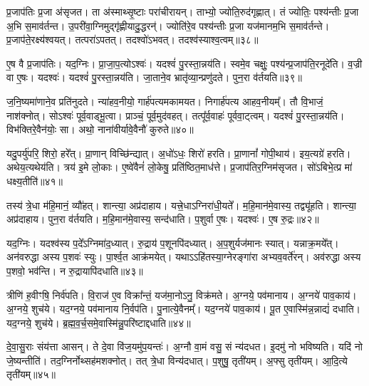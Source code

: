 प्र॒जा\-प॑तिः प्र॒जा अ॑\-सृजत।
ता अ॑स्माथ्सृ॒ष्टाः परा॑चीरायन्।
ताभ्यो॒ ज्योति॒रुद॑गृह्णात्।
तं ज्योतिः॒ पश्य॑न्तीः प्र॒जा अ॒भि स॒माव॑र्तन्त।
उ॒परी॑वा॒ग्निमुद्गृ॑ह्णीयादु॒द्धरन्॑।
ज्योति॑रे॒व पश्य॑न्तीः प्र॒जा यज॑मानम॒भि स॒माव॑र्तन्ते।
प्र॒जा\-प॑ते॒रक्ष्य॑श्वयत्।
तत्परा॑\-ऽपतत्।
तदश्वो॑\-ऽभवत्।
तदश्व॑स्याश्व॒त्वम्॥३८॥\ip

ए॒ष वै प्र॒जा\-प॑तिः।
यद॒ग्निः।
प्रा॒जा॒प॒त्यो\-ऽश्वः॑।
यदश्वं॑ पु॒रस्ता॒न्नय॑ति।
स्वमे॒व चक्षुः॒ पश्य॑न्प्र॒जा\-प॑ति॒रनूदे॑ति।
व॒ज्री वा ए॒षः।
यदश्वः॑।
यदश्वं॑ पु॒रस्ता॒न्नय॑ति।
जा॒ताने॒व भ्रातृ॑व्या॒न्प्रणु॑दते।
पुन॒रा व॑र्तयति॥३९॥\ip

ज॒नि॒ष्यमा॑णाने॒व प्रति॑\-नुदते।
न्या॑हव॒नीयो॒ गार्\mbox{}ह॑पत्य\-मकामयत।
निगार्\mbox{}ह॑पत्य आहव॒नीयम्᳚।
तौ वि॒भाजं॒ नाश॑क्नोत्।
सोऽश्वः॑ पूर्व॒वाड्भू॒त्वा।
प्राञ्चं॒ पूर्व॒मुद॑वहत्।
तत्पू᳚र्व॒वाहः॑ पूर्ववा॒ट्त्वम्।
यदश्वं॑ पु॒रस्ता॒न्नय॑ति।
विभ॑क्ति\-रे॒वैन॑योः॒ सा।
अथो॒ नाना॑वीर्यावे॒वैनौ॑ कुरुते॥४०॥\ip

यदु॒पर्यु॑परि॒ शिरो॒ हरे᳚त्।
प्रा॒णान्‌ वि\-च्छि॑न्द्यात्।
अ॒धो॑ऽधः॒ शिरो॑ हरति।
प्रा॒णानां᳚ गोपी॒थाय॑।
इय॒त्यग्रे॑ हरति।
अथेय॒त्यथेय॑ति।
त्रय॑ इ॒मे लो॒काः।
ए॒ष्वे॑वैनं॑ लो॒केषु॒ प्रति॑\-ष्ठित॒माध॑त्ते।
प्र॒जा\-प॑तिर॒ग्निम॑\-सृजत।
सो॑ऽबिभे॒त्प्र मा॑ धक्ष्य॒तीति॑॥४१॥\ip

तस्य॑ त्रे॒धा म॑हि॒मानं॒ व्यौ॑हत्।
शान्त्या॒ अप्र॑दाहाय।
यत्त्रे॒धा\-ऽग्निरा॑धी॒यते᳚।
म॒हि॒मान॑मे॒वास्य॒ तद्व्यू॑हति।
शान्त्या॒ अप्र॑दाहाय।
पुन॒रा व॑र्तयति।
म॒हि॒मान॑मे॒वास्य॒ सन्द॑धाति।
प॒शुर्वा ए॒षः।
यदश्वः॑।
ए॒ष रु॒द्रः॥४२॥\ip

यद॒ग्निः।
यदश्व॑स्य प॒दे᳚\-ऽग्निमा॑द॒ध्यात्।
रु॒द्राय॑ प॒शूनपि॑\-दध्यात्।
अ॒प॒शुर्यज॑मानः स्यात्।
यन्नाक्र॒मये᳚त्।
अन॑वरुद्धा अस्य प॒शवः॑ स्युः।
पा॒र्श्व॒त आक्र॑मयेत्।
यथाऽऽहि॑तस्या॒ग्नेरङ्गा॑रा अभ्यव॒वर्ते॑रन्।
अव॑रुद्धा अस्य प॒शवो॒ भव॑न्ति।
न रु॒द्रायापि॑दधाति॥४३॥\ip

त्रीणि॑ ह॒वीꣳषि॒ निर्व॑पति।
वि॒राज॑ ए॒व विक्रा᳚न्तं॒ यज॑मा॒नोऽनु॒ विक्र॑मते।
अ॒ग्नये॒ पव॑मानाय।
अ॒ग्नये॑ पाव॒काय॑।
अ॒ग्नये॒ शुच॑ये।
यद॒ग्नये॒ पव॑मानाय नि॒र्वप॑ति।
पु॒नात्ये॒वैनम्᳚।
यद॒ग्नये॑ पाव॒काय॑।
पू॒त ए॒वास्मि॑न्न॒न्नाद्यं॑ दधाति।
यद॒ग्नये॒ शुच॑ये।
ब्र॒ह्म॒व॒र्च॒समे॒वास्मि॑न्नु॒परि॑ष्टाद्दधाति॥४४॥\ip\anuvakamend[ए॒न॒मा॒ह॒व॒नीयं॑ धत्ते\-ऽश्व॒त्वं व॑र्तयति कुरुत॒ इति॑ रु॒द्रो द॑धाति॒ यद॒ग्नये॒ शुच॑य॒ एकं॑ च]

दे॒वा॒सु॒राः संय॑त्ता आसन्।
ते दे॒वा वि॑ज॒यमु॑प॒यन्तः॑।
अ॒ग्नौ वा॒मं वसु॒ सं न्य॑दधत।
इ॒दमु॑ नो भविष्यति।
यदि॑ नो जे॒ष्यन्तीति॑।
तद॒ग्निर्नोथ्सह॑मशक्नोत्।
तत् त्रे॒धा विन्य॑दधात्।
प॒शुषु॒ तृती॑यम्।
अ॒फ्सु तृती॑यम्।
आ॒दि॒त्ये तृती॑यम्॥४५॥\ip

